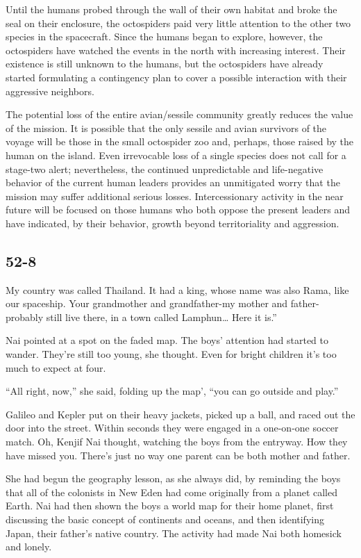 \documentclass[]{article}
\begin{document}
{{Until the humans probed through the wall of their own habitat and broke the seal on their enclosure, the octospiders paid very little attention to the other two species in the spacecraft.  Since the humans began to explore, however, the octospiders have watched the events in the north with increasing interest.  Their existence is still unknown to the humans, but the octospiders have already started formulating a contingency plan to cover a possible interaction with their aggressive neighbors.

The potential loss of the entire avian/sessile community greatly reduces the value of the mission.  It is possible that the only sessile and avian survivors of the voyage will be those in the small octospider zoo and, perhaps, those raised by the human on the island.  Even irrevocable loss of a single species does not call for a stage-two alert; nevertheless, the continued unpredictable and life-negative behavior of the current human leaders provides an unmitigated worry that the mission may suffer additional serious losses.  Intercessionary activity in the near future will be focused on those humans who both oppose the present leaders and have indicated, by their behavior, growth beyond territoriality and aggression.


\subsection*{52-8}

My country was called Thailand.  It had a king, whose name was also Rama, like our spaceship.  Your grandmother and grandfather-my mother and father-probably still live there, in a town called Lamphun…  Here it is.”

Nai pointed at a spot on the faded map.  The boys’ attention had started to wander.  They’re still too young, she thought.  Even for bright children it’s too much to expect at four.

“All right, now,” she said, folding up the map’, “you can go outside and play.”

Galileo and Kepler put on their heavy jackets, picked up a ball, and raced out the door into the street.  Within seconds they were engaged in a one-on-one soccer match.  Oh, Kenjif Nai thought, watching the boys from the entryway.  How they have missed you.  There’s just no way one parent can be both mother and father.

She had begun the geography lesson, as she always did, by reminding the boys that all of the colonists in New Eden had come originally from a planet called Earth.  Nai had then shown the boys a world map for their home planet, first discussing the basic concept of continents and oceans, and then identifying Japan, their father’s native country.  The activity had made Nai both homesick and lonely.

}}
\end{document}
